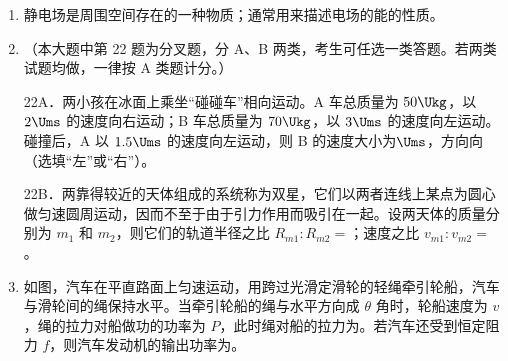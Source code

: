 \documentclass[\gkver]{gaokaozhenti}
\begin{document}
\begin{enumerate}

\item
静电场是周围空间存在的一种物质；通常用来描述电场的能的性质。

\item
（本大题中第 22 题为分叉题，分 A、B 两类，考生可任选一类答题。若两类试题均做，一律按 A 类题计分。）

22A．两小孩在冰面上乘坐“碰碰车”相向运动。A 车总质量为 $50\Ukg$，以 $2\Ums$ 的速度向右运动；B 车总质量为 $70\Ukg$，以 $3\Ums$ 的速度向左运动。碰撞后，A 以 $1.5\Ums$ 的速度向左运动，则 B 的速度大小为$\Ums$，方向向（选填“左”或“右”）。

22B．两靠得较近的天体组成的系统称为双星，它们以两者连线上某点为圆心做匀速圆周运动，因而不至于由于引力作用而吸引在一起。设两天体的质量分别为 $m_{1}$ 和 $m_{2}$，则它们的轨道半径之比 $R_{m1}:R_{m2}=$；速度之比 $v_{m1}:v_{m2}=$。

\item
如图，汽车在平直路面上匀速运动，用跨过光滑定滑轮的轻绳牵引轮船，汽车与滑轮间的绳保持水平。当牵引轮船的绳与水平方向成 $\theta$ 角时，轮船速度为 $v$，绳的拉力对船做功的功率为 $P$，此时绳对船的拉力为。若汽车还受到恒定阻力 $f$，则汽车发动机的输出功率为。


\end{enumerate}
\end{document}
